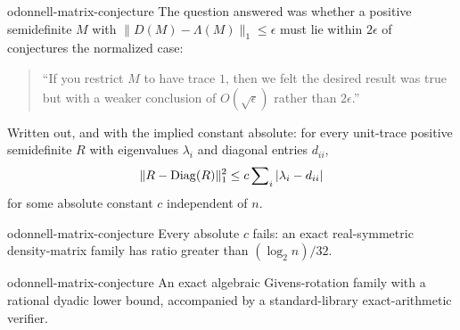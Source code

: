 \begin{cxstatement}{odonnell-matrix-conjecture}
The question answered was whether a positive semidefinite $M$ with
$\lVert D(M)-\Lambda(M)\rVert_1\leq\epsilon$ must lie within $2\epsilon$ of
conjectures the normalized case:

\begin{quote}
``If you restrict $M$ to have trace $1$, then we felt the desired result was
true but with a weaker conclusion of $O(\sqrt\epsilon)$ rather than
$2\epsilon$.''
\end{quote}

Written out, and with the implied constant absolute: for every unit-trace
positive semidefinite $R$ with eigenvalues $\lambda_i$ and diagonal entries
$d_{ii}$,
\[
  \lVert R-\operatorname{Diag}(R)\rVert_1^2
  \leq c\sum\nolimits_i |\lambda_i-d_{ii}|
\]
for some absolute constant $c$ independent of $n$.
\end{cxstatement}

\begin{cxsummary}{odonnell-matrix-conjecture}
Every absolute $c$ fails: an exact real-symmetric density-matrix family has ratio greater than $(\log_2 n)/32$.
\end{cxsummary}

\begin{cxcertificate}{odonnell-matrix-conjecture}
An exact algebraic Givens-rotation family with a rational dyadic lower bound, accompanied by a standard-library exact-arithmetic verifier.
\end{cxcertificate}

